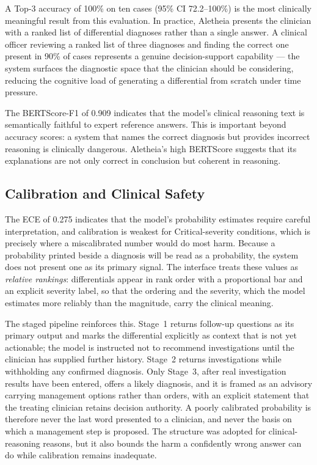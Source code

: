 \documentclass[journal]{IEEEtran}
\begin{document}
A Top-3 accuracy of 100\% on ten cases (95\% CI 72.2--100\%) is
the most clinically meaningful
result from this evaluation. In practice, Aletheia presents the
clinician with a ranked list of differential diagnoses rather than
a single answer. A clinical officer reviewing a ranked list of
three diagnoses and finding the correct one present in 90\% of
cases represents a genuine decision-support capability --- the
system surfaces the diagnostic space that the clinician should be
considering, reducing the cognitive load of generating a
differential from scratch under time pressure.

The BERTScore-F1 of 0.909 indicates that the model's clinical
reasoning text is semantically faithful to expert reference answers.
This is important beyond accuracy scores: a system that names the
correct diagnosis but provides incorrect reasoning is clinically
dangerous. Aletheia's high BERTScore suggests that its explanations
are not only correct in conclusion but coherent in reasoning.

\subsection{Calibration and Clinical Safety}

The ECE of 0.275 indicates that the model's probability estimates
require careful interpretation, and calibration is weakest for
Critical-severity conditions, which is precisely where a miscalibrated
number would do most harm. Because a probability printed beside a
diagnosis will be read as a probability, the system does not present
one as its primary signal. The interface treats these values as
\textit{relative rankings}: differentials appear in rank order with a
proportional bar and an explicit severity label, so that the ordering
and the severity, which the model estimates more reliably than the
magnitude, carry the clinical meaning.

The staged pipeline reinforces this. Stage~1 returns follow-up
questions as its primary output and marks the differential explicitly
as context that is not yet actionable; the model is instructed not to
recommend investigations until the clinician has supplied further
history. Stage~2 returns investigations while withholding any confirmed
diagnosis. Only Stage~3, after real investigation results have been
entered, offers a likely diagnosis, and it is framed as an advisory
carrying management options rather than orders, with an explicit
statement that the treating clinician retains decision authority. A
poorly calibrated probability is therefore never the last word
presented to a clinician, and never the basis on which a management
step is proposed. The structure was adopted for clinical-reasoning
reasons, but it also bounds the harm a confidently wrong answer can do
while calibration remains inadequate.
\end{document}
